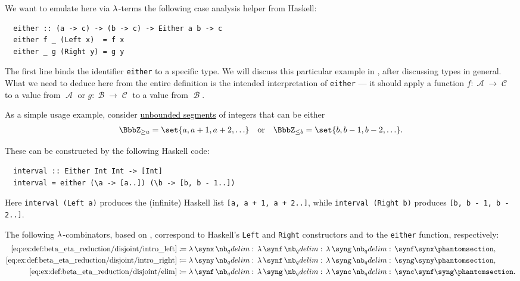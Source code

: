 \begin{example}
\begin{thmenum}
    We want to emulate here via \( \mathrm{\lambda} \)-terms the following case analysis helper from Haskell:
    \begin{verbatim}
  either :: (a -> c) -> (b -> c) -> Either a b -> c
  either f _ (Left x)  = f x
  either _ g (Right y) = g y
    \end{verbatim}\vspace{-\baselineskip}

    The first line binds the identifier \verb|either| to a specific type. We will discuss this particular example in , after discussing types in general. What we need to deduce here from the entire definition is the intended interpretation of \verb|either| --- it should apply a function \( f: \mscrA \to \mscrC \) to a value from \( \mscrA \) or \( g: \mscrB \to \mscrC \) to a value from \( \mscrB \).

    As a simple usage example, consider \hyperref[def:order_interval/unbounded]{unbounded segments} of integers that can be either
    \begin{align*}
      \BbbZ_{\geq a} = \set{ a, a + 1, a + 2, \ldots }
      &&\T{or}&&
      \BbbZ_{\leq b} = \set{ b, b - 1, b - 2, \ldots }.
    \end{align*}

    These can be constructed by the following Haskell code:
    \begin{verbatim}
  interval :: Either Int Int -> [Int]
  interval = either (\a -> [a..]) (\b -> [b, b - 1..])
    \end{verbatim}\vspace{-\baselineskip}

    Here \verb|interval (Left a)| produces the (infinite) Haskell list \verb|[a, a + 1, a + 2..]|, while \verb|interval (Right b)| produces \verb|[b, b - 1, b - 2..]|.

    The following \( \mathrm{\lambda} \)-combinators, based on \cite{MathOF:product_type_in_simply_typed_lambda_terms}, correspond to Haskell's \verb|Left| and \verb|Right| constructors and to the \verb|either| function, respectively:
    \begin{align*}
      \ref{eq:ex:def:beta_eta_reduction/disjoint/intro_left}  &\coloneqq \qabs \synx \qabs \synf \qabs \syng \synf \synx       \taglabel[\ensuremath{ S_{+L} }]{eq:ex:def:beta_eta_reduction/disjoint/intro_left}, \\
      \ref{eq:ex:def:beta_eta_reduction/disjoint/intro_right} &\coloneqq \qabs \syny \qabs \synf \qabs \syng \syng \syny       \taglabel[\ensuremath{ S_{+R} }]{eq:ex:def:beta_eta_reduction/disjoint/intro_right}, \\
      \ref{eq:ex:def:beta_eta_reduction/disjoint/elim}        &\coloneqq \qabs \synf \qabs \syng \qabs \sync \sync \synf \syng \taglabel[\ensuremath{ S_- }]{eq:ex:def:beta_eta_reduction/disjoint/elim}.
    \end{align*}


\end{thmenum}
\end{example}
